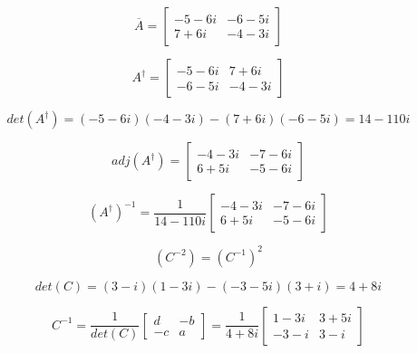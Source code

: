\documentclass{article}
\begin{document}
\begin{equation}
    \overline{A}= 
\begin{bmatrix}
-5-6i & -6-5i \\
7+6i & -4-3i
\end{bmatrix}\nonumber
\end{equation}

\begin{equation}
    A^\dag = 
\begin{bmatrix}
-5-6i & 7+6i\\
 -6-5i & -4-3i
\end{bmatrix}\nonumber
\end{equation}



\begin{equation}
det(A^\dag)=(-5-6i)(-4-3i)-(7+6i)(-6-5i)=14-110i\nonumber
\end{equation}

\begin{equation}
adj(A^\dag)=
\begin{bmatrix}
 -4-3i & -7-6i\\
 6+5i & -5-6i
\end{bmatrix}\nonumber
\end{equation}

\begin{equation}
    (A^{\dag})^{-1} = 
    \frac{1}{14-110i}
\begin{bmatrix}
 -4-3i & -7-6i\\
 6+5i & -5-6i
\end{bmatrix}\nonumber
\end{equation}


\begin{equation}
    (C^{-2}) = (C^{-1})^{2}\nonumber
\end{equation}

\begin{equation}\nonumber
det(C) =(3-i)(1-3i)-(-3-5i)(3+i)=4+8i
\end{equation}

\begin{equation}
C^{-1}=\frac{1}{det(C)}
\begin{bmatrix}
    d & -b \\
    -c & a 
\end{bmatrix}
=
\frac{1}{4+8i}
\begin{bmatrix}
1-3i & 3+5i \\
-3-i & 3-i
\end{bmatrix}\nonumber
\end{equation}
\end{document}

